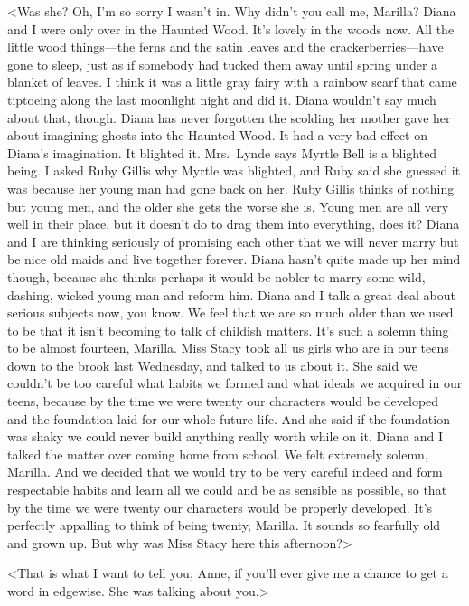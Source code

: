 <Was she? Oh, I'm so sorry I wasn't in. Why didn't you call me, Marilla? Diana and I were only over in the Haunted Wood. It's lovely in the woods now. All the little wood things—the ferns and the satin leaves and the crackerberries—have gone to sleep, just as if somebody had tucked them away until spring under a blanket of leaves. I think it was a little gray fairy with a rainbow scarf that came tiptoeing along the last moonlight night and did it. Diana wouldn't say much about that, though. Diana has never forgotten the scolding her mother gave her about imagining ghosts into the Haunted Wood. It had a very bad effect on Diana's imagination. It blighted it. Mrs.~Lynde says Myrtle Bell is a blighted being. I asked Ruby Gillis why Myrtle was blighted, and Ruby said she guessed it was because her young man had gone back on her. Ruby Gillis thinks of nothing but young men, and the older she gets the worse she is. Young men are all very well in their place, but it doesn't do to drag them into everything, does it? Diana and I are thinking seriously of promising each other that we will never marry but be nice old maids and live together forever. Diana hasn't quite made up her mind though, because she thinks perhaps it would be nobler to marry some wild, dashing, wicked young man and reform him. Diana and I talk a great deal about serious subjects now, you know. We feel that we are so much older than we used to be that it isn't becoming to talk of childish matters. It's such a solemn thing to be almost fourteen, Marilla. Miss Stacy took all us girls who are in our teens down to the brook last Wednesday, and talked to us about it. She said we couldn't be too careful what habits we formed and what ideals we acquired in our teens, because by the time we were twenty our characters would be developed and the foundation laid for our whole future life. And she said if the foundation was shaky we could never build anything really worth while on it. Diana and I talked the matter over coming home from school. We felt extremely solemn, Marilla. And we decided that we would try to be very careful indeed and form respectable habits and learn all we could and be as sensible as possible, so that by the time we were twenty our characters would be properly developed. It's perfectly appalling to think of being twenty, Marilla. It sounds so fearfully old and grown up. But why was Miss Stacy here this afternoon?>

<That is what I want to tell you, Anne, if you'll ever give me a chance to get a word in edgewise. She was talking about you.>

